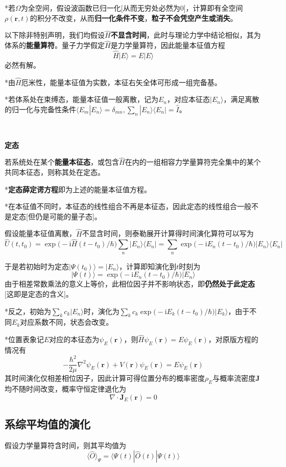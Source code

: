 \documentclass[a4paper,UTF8,fontset=windows]{ctexart}
\newcommand*{\ir}{\mathrm{i}}
\newcommand*{\ket}[1]{|#1\rangle}
\newcommand*{\bra}[1]{\langle#1|}
\newcommand*{\bk}[2]{\langle#1|#2\rangle}
\newcommand*{\blk}[3]{\langle#1|#2|#3\rangle}
\newcommand*{\br}{\mathbf{r}}
\newcommand*{\bj}{\mathbf{J}}
\begin{document}
*若$\Omega$为全空间，假设波函数已归一化[从而无穷处必然为0]，计算即有全空间$\rho(\br,t)$的积分不改变，从而\textbf{归一化条件不变}，\textbf{粒子不会凭空产生或消失}。

以下除非特别声明，我们均假设$\hat{H}$\textbf{不显含时间}，此时与理论力学中结论相似，其为体系的\textbf{能量算符}。量子力学假定$\hat{H}$是力学量算符，因此能量本征值方程
$$\hat{H}\ket{E}=E\ket{E}$$
必然有解。

*由$\hat{H}$厄米性，能量本征值为实数，本征右矢全体可形成一组完备基。

*若体系处在束缚态，能量本征值一般离散，记为$E_n$，对应本征态$\ket{E_n}$，满足离散的归一化与完备性条件$\bk{E_m}{E_n}=\delta_{mn},\sum_n\ket{E_n}\bra{E_n}=\hat{I}$。

\

\textbf{定态}

若系统处在某个\textbf{能量本征态}，或包含$\hat{H}$在内的一组相容力学量算符完全集中的某个共同本征态，则称其处在定态。

*\textbf{定态薛定谔方程}即为上述的能量本征值方程。

*在本征值不同时，本征态的线性组合不再是本征态，因此定态的线性组合一般不是定态[但仍是可能的量子态]。

假设能量本征值离散，$\hat{H}$不显含时间，则泰勒展开计算得时间演化算符可以写为
$$\hat{U}(t,t_0)=\exp\big(-\ir\hat{H}(t-t_0)/\hbar\big)\sum_n\ket{E_n}\bra{E_n}=\sum_n\exp\big(-\ir E_n(t-t_0)/\hbar\big)\ket{E_n}\bra{E_n}$$

于是若初始时为定态$\ket{\Psi(t_0)}=\ket{E_n}$，计算即知演化到$t$时刻为
$$\ket{\Psi(t)}=\exp\big(-\ir E_n(t-t_0)/\hbar\big)\ket{E_n}$$
由于相差常数乘法的意义上等价，此相位因子并不影响状态，即\textbf{仍然处于此定态}[这即是定态的含义]。

*反之，初始为$\sum_kc_k\ket{E_n}$时，演化为$\sum_kc_k\exp\big(-\ir E_k(t-t_0)/\hbar\big)\ket{E_k}$，由于不同$E_k$对应系数不同，状态会改变。

*位置表象记$E$对应的本征态为$\psi_E(\br)$，则$\hat{H}\psi_E(\br)=E\psi_E(\br)$，对原版方程的情况有
$$-\frac{\hbar^2}{2\mu}\nabla^2\psi_E(\br)+V(\br)\psi_E(\br)=E\psi_E(\br)$$
其时间演化仅相差相位因子，因此计算可得位置分布的概率密度$\rho_E$与概率流密度$\bj$均不随时间改变，概率守恒定律退化为
$$\nabla\cdot\bj_E(\br)=0$$

\subsection{系综平均值的演化}
假设力学量算符含时间，则其平均值为
$$\langle\hat{O}\rangle_\Psi=\blk{\Psi(t)}{\hat{O}(t)}{\Psi(t)}$$
\end{document}

